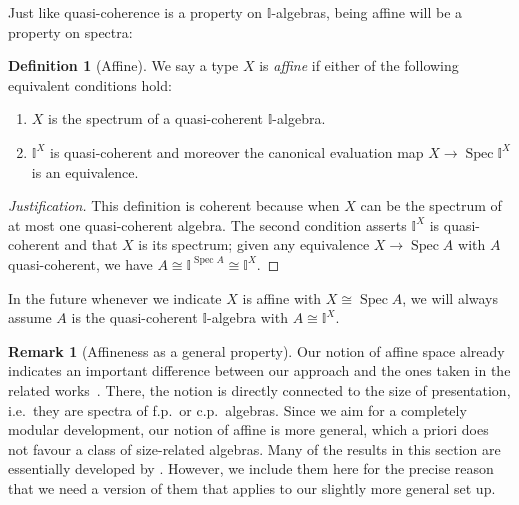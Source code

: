 \documentclass[a4paper,12pt]{amsart}
\theoremstyle{definition}
\newtheorem{definition}[theorem]{Definition}
\newtheorem{remark}[theorem]{Remark}
\newcommand{\mbb}[1]{\mathbb{#1}}
\newcommand{\I}{\mbb I}
\newcommand{\spec}{\operatorname{Spec}}
\begin{document}
Just like quasi-coherence is a property on $\I$-algebras, being affine will be a property on spectra:

\begin{definition}[Affine]
  We say a type $X$ is \emph{affine} if either of the following equivalent conditions hold:
  \begin{enumerate}
    \item $X$ is the spectrum of a quasi-coherent $\I$-algebra.
    \item $\I^X$ is quasi-coherent and moreover the canonical evaluation map $X \to \spec \I^X$ is an equivalence.
  \end{enumerate}
\end{definition}

\begin{proof}[Justification]
  This definition is coherent because when $X$ can be the spectrum of at most one quasi-coherent algebra. The second condition asserts $\I^X$ is quasi-coherent and that $X$ is its spectrum; given any equivalence $X\to \spec{A}$ with $A$ quasi-coherent, we have
  $
    A\cong \I^{\spec{A}} \cong \I^X
  $.
\end{proof}

In the future whenever we indicate $X$ is affine with $X \cong \spec A$, we will always assume $A$ is the quasi-coherent $\I$-algebra with $A \cong \I^X$.

\begin{remark}[Affineness as a general property]
  Our notion of affine space already indicates an important difference between our approach and the ones taken in the related works~\cite{Cherubini_Coquand_Hutzler_2024,cherubini2024foundation}. There, the notion is directly connected to the size of presentation, i.e.\ they are spectra of f.p.\ or c.p.\ algebras. Since we aim for a completely modular development, our notion of affine is more general, which a priori does not favour a class of size-related algebras. Many of the results in this section are essentially developed by \citet{Cherubini_Coquand_Hutzler_2024}. However, we include them here for the precise reason that we need a version of them that applies to our slightly more general set up.
\end{remark}
\end{document}
